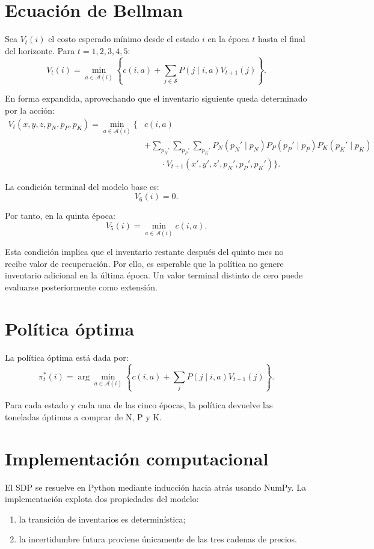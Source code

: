 \documentclass[11pt]{article}
\begin{document}
\section{Ecuación de Bellman}

Sea $V_t(i)$ el costo esperado mínimo desde el estado $i$ en la época $t$ hasta el final del horizonte. Para $t=1,2,3,4,5$:
\[
V_t(i)=
\min_{a\in\mathcal{A}(i)}
\left\{
c(i,a)+\sum_{j\in\mathcal{S}}P(j\mid i,a)V_{t+1}(j)
\right\}.
\]

En forma expandida, aprovechando que el inventario siguiente queda determinado por la acción:
\begin{align*}
V_t(x,y,z,p_N,p_P,p_K)=\min_{a\in\mathcal A(i)}\Bigg\{&c(i,a)\\
&+\sum_{p_N'}\sum_{p_P'}\sum_{p_K'}
P_N(p_N'\mid p_N)
P_P(p_P'\mid p_P)
P_K(p_K'\mid p_K)\\
&\qquad\cdot V_{t+1}(x',y',z',p_N',p_P',p_K')\Bigg\}.
\end{align*}

La condición terminal del modelo base es:
\[
V_6(i)=0.
\]

Por tanto, en la quinta época:
\[
V_5(i)=\min_{a\in\mathcal A(i)}c(i,a).
\]

Esta condición implica que el inventario restante después del quinto mes no recibe valor de recuperación. Por ello, es esperable que la política no genere inventario adicional en la última época. Un valor terminal distinto de cero puede evaluarse posteriormente como extensión.

\section{Política óptima}

La política óptima está dada por:
\[
\pi_t^*(i)=
\arg\min_{a\in\mathcal A(i)}
\left\{
c(i,a)+\sum_jP(j\mid i,a)V_{t+1}(j)
\right\}.
\]

Para cada estado y cada una de las cinco épocas, la política devuelve las toneladas óptimas a comprar de N, P y K.

\section{Implementación computacional}

El SDP se resuelve en Python mediante inducción hacia atrás usando NumPy. La implementación explota dos propiedades del modelo:
\begin{enumerate}[label=\arabic*.]
    \item la transición de inventarios es determinística;
    \item la incertidumbre futura proviene únicamente de las tres cadenas de precios.
\end{enumerate}
\end{document}
